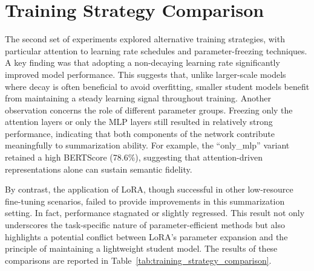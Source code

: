 \section{Training Strategy Comparison}
The second set of experiments explored alternative training strategies, with particular attention to learning rate schedules and parameter-freezing techniques. A key finding was that adopting a non-decaying learning rate significantly improved model performance. This suggests that, unlike larger-scale models where decay is often beneficial to avoid overfitting, smaller student models benefit from maintaining a steady learning signal throughout training.
Another observation concerns the role of different parameter groups. Freezing only the attention layers or only the MLP layers still resulted in relatively strong performance, indicating that both components of the network contribute meaningfully to summarization ability. For example, the ``only\_mlp'' variant retained a high BERTScore (78.6\%), suggesting that attention-driven representations alone can sustain semantic fidelity.

By contrast, the application of LoRA, though successful in other low-resource fine-tuning scenarios, failed to provide improvements in this summarization setting. In fact, performance stagnated or slightly regressed. This result not only underscores the task-specific nature of parameter-efficient methods but also highlights a potential conflict between LoRA’s parameter expansion and the principle of maintaining a lightweight student model. The results of these comparisons are reported in Table~\ref{tab:training_strategy_comparison}.

{
    \label{tab:training_strategy_comparison}
    \centering
}


